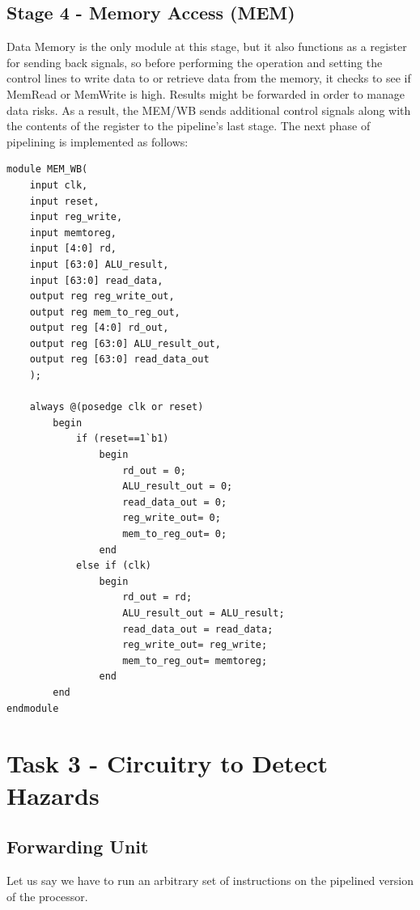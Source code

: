 \documentclass{article}
\begin{document}
\subsection{Stage 4 - Memory Access (MEM)}

Data Memory is the only module at this stage, but it also functions as a register for sending back signals, so before performing the operation and setting the control lines to write data to or retrieve data from the memory, it checks to see if MemRead or MemWrite is high. Results might be forwarded in order to manage data risks. As a result, the MEM/WB sends additional control signals along with the contents of the register to the pipeline's last stage. The next phase of pipelining is implemented as follows:

\begin{lstlisting}[caption={MEM/WB Register}, captionpos=b, language=RISC-V]
module MEM_WB(
    input clk,
    input reset,
    input reg_write,
    input memtoreg,
    input [4:0] rd,
    input [63:0] ALU_result,
    input [63:0] read_data,
    output reg reg_write_out,
    output reg mem_to_reg_out,
    output reg [4:0] rd_out,
    output reg [63:0] ALU_result_out,
    output reg [63:0] read_data_out 
    );
       
    always @(posedge clk or reset)
        begin
            if (reset==1`b1)
                begin
                    rd_out = 0;
                    ALU_result_out = 0;
                    read_data_out = 0;
                    reg_write_out= 0;
                    mem_to_reg_out= 0;            	
                end
            else if (clk)
                begin
                    rd_out = rd;
                    ALU_result_out = ALU_result;
                    read_data_out = read_data;
                    reg_write_out= reg_write;
                    mem_to_reg_out= memtoreg;            	
                end
        end        
endmodule
\end{lstlisting}

\section{Task 3 - Circuitry to Detect Hazards}

\subsection{Forwarding Unit}
Let us say we have to run an arbitrary set of instructions on the pipelined version of the processor. 
\end{document}

